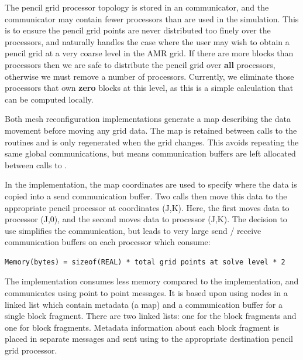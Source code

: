 The pencil grid processor topology is stored in an 
communicator, and the communicator may contain fewer processors than are used in the
simulation.  This is to ensure the pencil grid points are never
distributed too finely over the processors, and naturally handles the 
case where the user may wish to obtain a pencil grid at a very coarse
level in the AMR grid.  If there are more blocks
than processors then we are safe to distribute the pencil grid over
{\bf all} processors, otherwise we must remove a number of processors.
Currently, we eliminate those processors that own {\bf zero} 
blocks at this level, as this is a simple calculation that can be
computed locally.

Both mesh reconfiguration implementations generate a map describing 
the data movement before moving any grid data.  The map is 
retained between calls to the  routines and is 
only regenerated when the grid changes.  This avoids repeating 
the same global communications, but means communication buffers are
left allocated between calls to .

In the  
implementation, the map coordinates are used to specify where 
the  data is copied into a send communication buffer.  Two 
 calls then move this data to the appropriate
pencil processor at coordinates (J,K).  Here, the first  moves data 
to processor (J,0), and the second  moves data 
to processor (J,K).  The decision to use 
simplifies the  communication, but leads to very large 
send / receive communication buffers on each processor which consume:

\begin{verbatim}
Memory(bytes) = sizeof(REAL) * total grid points at solve level * 2
\end{verbatim}

The  implementation consumes less memory compared to the
 implementation, and communicates using point to
point  messages.  It is based upon using nodes in a linked
list which contain metadata (a map) and a communication buffer for a
single block fragment.  There are two linked lists: one for the
 block fragments and one for  block fragments.
Metadata information about each  block fragment is placed
in separate messages and sent using  to the
appropriate destination pencil grid processor.

